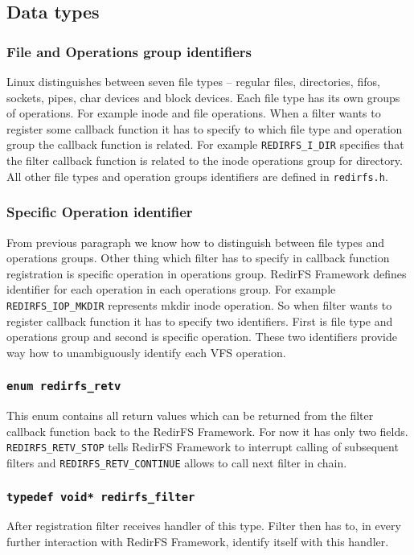 \subsection{Data types}

\subsubsection{File and Operations group identifiers}
Linux distinguishes between seven file types -- regular files, directories, fifos,
sockets, pipes, char devices and block devices. Each file type has its own groups of
operations. For example inode and file operations. When a filter wants to register some 
callback function it has to specify to which file type and operation group the
callback function is related. For example \texttt{REDIRFS\_I\_DIR} specifies that the
filter callback function is related to the inode operations group for directory.
All other file types and operation groups identifiers are defined in
\texttt{redirfs.h}.

\subsubsection{Specific Operation identifier}
From previous paragraph we know how to distinguish between file types and operations
groups. Other thing which filter has to specify in callback function registration is
specific operation in operations group. RedirFS Framework defines identifier for each
operation in each operations group. For example \texttt{REDIRFS\_IOP\_MKDIR}
represents mkdir inode operation. So when filter wants to register callback function
it has to specify two identifiers. First is file type and operations group and second
is specific operation. These two identifiers provide way how to unambiguously
identify each VFS operation.

\subsubsection{\texttt{enum redirfs\_retv}}
This enum contains all return values which can be returned from the filter callback
function back to the RedirFS Framework. For now it has only two fields.
\texttt{REDIRFS\_RETV\_STOP} tells RedirFS Framework to interrupt calling of subsequent
filters and \texttt{REDIRFS\_RETV\_CONTINUE} allows to call next filter in chain.

\subsubsection{\texttt{typedef void* redirfs\_filter}}
After registration filter receives handler of this type. Filter then has to, in every
further interaction with RedirFS Framework, identify itself with this handler.

